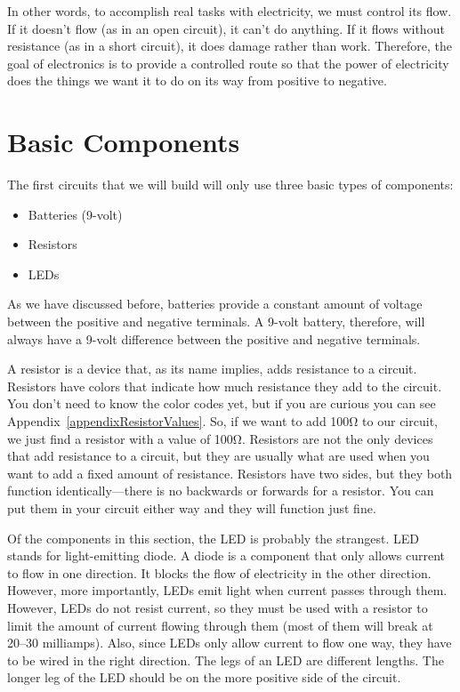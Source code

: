 In other words, to accomplish real tasks with electricity, we must control its flow.  
If it doesn't flow (as in an open circuit), it can't do anything.
If it flows without resistance (as in a short circuit), it does damage rather than work.
Therefore, the goal of electronics is to provide a controlled route so that the power of electricity does the things we want it to do on its way from positive to negative.

\section{Basic Components}

The first circuits that we will build will only use three basic types of components:
\begin{itemize}
\item Batteries (9-volt)
\item Resistors
\item LEDs
\end{itemize}

As we have discussed before, batteries provide a constant amount of voltage between the positive and negative terminals.
A 9-volt battery, therefore, will always have a 9-volt difference between the positive and negative terminals.

A resistor is a device that, as its name implies, adds resistance to a circuit.
Resistors have colors that indicate how much resistance they add to the circuit.
You don't need to know the color codes yet, but if you are curious you can see Appendix~\ref{appendixResistorValues}.
So, if we want to add 100\si{\ohm} to our circuit, we just find a resistor with a value of 100\si{\ohm}.
Resistors are not the only devices that add resistance to a circuit, but they are usually what are used when you want to add a fixed amount of resistance.
Resistors have two sides, but they both function identically---there is no backwards or forwards for a resistor.  
You can put them in your circuit either way and they will function just fine.

Of the components in this section, the LED is probably the strangest.
LED stands for light-emitting diode.
A diode is a component that only allows current to flow in one direction.
It blocks the flow of electricity in the other direction.
However, more importantly, LEDs emit light when current passes through them.
However, LEDs do not resist current, so they must be used with a resistor to limit the amount of current flowing through them (most of them will break at 20--30 milliamps).
Also, since LEDs only allow current to flow one way, they have to be wired in the right direction.
The legs of an LED are different lengths.
The longer leg of the LED should be on the more positive side of the circuit.

